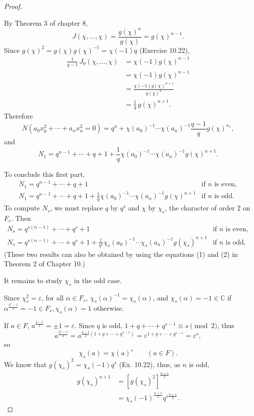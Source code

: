 \documentclass[11pt,a4paper]{article}
\newcommand{\C}{\mathbb{C}}
\begin{document}
\begin{proof}
\begin{enumerate}
By Theorem 3 of chapter 8,
$$J(\chi,\ldots,\chi) = \frac{g(\chi)^n}{g(\chi)} = g(\chi)^{n-1}.$$
Since $g(\chi)^2 = g(\chi) g(\chi)^{-1}= \chi(-1)q$ (Exercise 10.22), 
\begin{align*}
\frac{1}{q-1} \, J_0(\chi,\ldots,\chi) &= \chi(-1)g(\chi)^{n-1}\\
&= \chi(-1) g(\chi)^{n-1}\\
&=\frac{\chi(-1) g(\chi)^{n+1}}{g(\chi)^2}\\
&= \frac{1}{q}\,  g(\chi)^{n+1}.
 \end{align*}
 Therefore
 $$N(a_0x_0^2+\cdots+a_n x_n^2=0)  = q^n + \chi(a_0)^{-1}\cdots \chi(a_n)^{-1} \frac{q-1}{q} g(\chi)^{n_1},$$
 and 
 $$N_1 = q^{n-1} + \cdots + q + 1 + \frac{1}{q} \chi(a_0)^{-1}\cdots \chi(a_n)^{-1}g(\chi)^{n+1}.$$
\end{enumerate}
To conclude this first part,
$$
\begin{array}{ll}
N_1 = q^{n-1} + \cdots + q + 1 &\text{if  $n$ is even},\\
N_1 = q^{n-1} + \cdots + q + 1 + \frac{1}{q} \chi(a_0)^{-1}\cdots \chi(a_n)^{-1}g(\chi)^{n+1}& \text{if $n$ is odd}.
\end{array}
$$
To compute $N_s$, we must replace $q$ by $q^s$ and $\chi$ by $\chi_s$, the character of order $2$ on $F_s$. Then
$$
\begin{array}{ll}
N_s = q^{s(n-1)} + \cdots + q^s + 1 &\text{if  $n$ is even},\\
N_s = q^{s(n-1)} + \cdots + q^s + 1 + \frac{1}{q^s} \chi_s(a_0)^{-1}\cdots \chi_s(a_n)^{-1}g(\chi_s)^{n+1}& \text{if $n$ is odd}.
\end{array}
$$
(These two results can also be obtained by using the equations (1) and (2) in Theorem 2 of Chapter 10.)
\bigskip

It remains to study $\chi_s$ in the odd case. 

Since $\chi_s^2 = \varepsilon$, for all $\alpha \in F_s$, $\chi_s(\alpha)^{-1} = \chi_s(\alpha)$, and $\chi_s(\alpha) = -1 \in \C$ if $\alpha^\frac{q^s - 1}{2} = -1 \in F_s, \chi_s(\alpha) = 1$ otherwise.

If $a \in F$, $a^\frac{q-1}{2} = \pm 1 = \varepsilon$. Since $q$ is odd, $1+q+\cdots+q^{s-1} \equiv s \pmod 2$, thus
$$a^{\frac{q^s-1}{2}} = a^{\frac{q-1}{2} (1+q+\cdots + q^{s-1})} =\varepsilon^{1+q+\cdots + q^{s-1}} = \varepsilon^{s},$$
so
$$\chi_s(a) = \chi(a)^s \qquad (a \in F).$$
We know that $g(\chi_s)^2 = \chi_s(-1) q^s$ (Ex. 10.22), thus, as $n$ is odd,
\begin{align*}
g(\chi_s)^{n+1} &= \left[g(\chi_s)^2 \right]^{\frac{n+1}{2}}\\
&=\chi_s(-1)^\frac{n+1}{2} q^{s \frac{n+1}{2}}.
\end{align*}


\end{proof}
\end{document}
